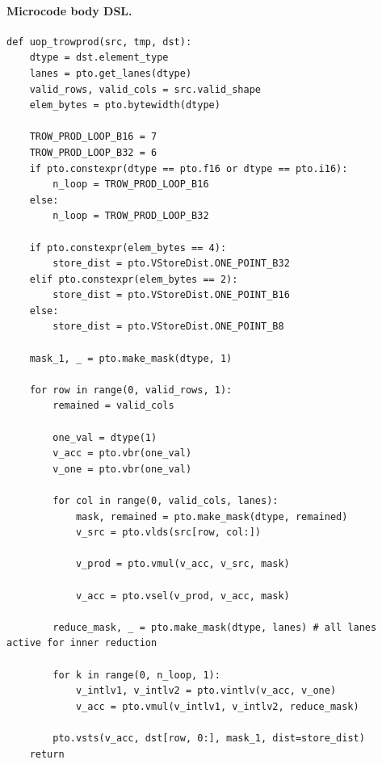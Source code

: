 \paragraph{Microcode body DSL.}
\begin{lstlisting}[style=ptocode]
def uop_trowprod(src, tmp, dst):
    dtype = dst.element_type
    lanes = pto.get_lanes(dtype)
    valid_rows, valid_cols = src.valid_shape
    elem_bytes = pto.bytewidth(dtype)

    TROW_PROD_LOOP_B16 = 7
    TROW_PROD_LOOP_B32 = 6
    if pto.constexpr(dtype == pto.f16 or dtype == pto.i16):
        n_loop = TROW_PROD_LOOP_B16
    else:
        n_loop = TROW_PROD_LOOP_B32

    if pto.constexpr(elem_bytes == 4):
        store_dist = pto.VStoreDist.ONE_POINT_B32
    elif pto.constexpr(elem_bytes == 2):
        store_dist = pto.VStoreDist.ONE_POINT_B16
    else:
        store_dist = pto.VStoreDist.ONE_POINT_B8

    mask_1, _ = pto.make_mask(dtype, 1)

    for row in range(0, valid_rows, 1):
        remained = valid_cols

        one_val = dtype(1)
        v_acc = pto.vbr(one_val)
        v_one = pto.vbr(one_val)

        for col in range(0, valid_cols, lanes):
            mask, remained = pto.make_mask(dtype, remained)
            v_src = pto.vlds(src[row, col:])

            v_prod = pto.vmul(v_acc, v_src, mask)

            v_acc = pto.vsel(v_prod, v_acc, mask)

        reduce_mask, _ = pto.make_mask(dtype, lanes) # all lanes active for inner reduction

        for k in range(0, n_loop, 1):
            v_intlv1, v_intlv2 = pto.vintlv(v_acc, v_one)
            v_acc = pto.vmul(v_intlv1, v_intlv2, reduce_mask)

        pto.vsts(v_acc, dst[row, 0:], mask_1, dist=store_dist)
    return
\end{lstlisting}
\Needspace{0.34\textheight}
